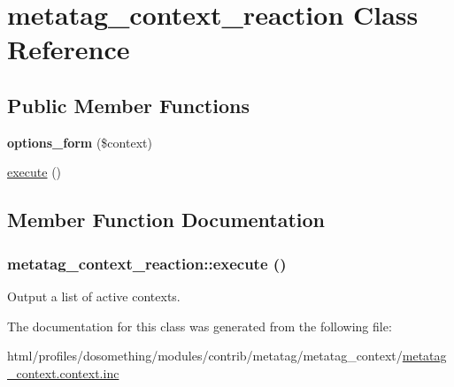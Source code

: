 \hypertarget{classmetatag__context__reaction}{
\section{metatag\_\-context\_\-reaction Class Reference}
\label{classmetatag__context__reaction}
}
\subsection*{Public Member Functions}
\begin{DoxyCompactItemize}
\item 
\hypertarget{classmetatag__context__reaction_a4fd234b5471839ebf1d9a4efc79d487c}{
{\bfseries options\_\-form} (\$context)}
\label{classmetatag__context__reaction_a4fd234b5471839ebf1d9a4efc79d487c}

\item 
\hyperlink{classmetatag__context__reaction_a67587e64b42f087a71aba0be93e65b96}{execute} ()
\end{DoxyCompactItemize}


\subsection{Member Function Documentation}
\hypertarget{classmetatag__context__reaction_a67587e64b42f087a71aba0be93e65b96}{
\subsubsection[{execute}]{\setlength{\rightskip}{0pt plus 5cm}metatag\_\-context\_\-reaction::execute ()}}
\label{classmetatag__context__reaction_a67587e64b42f087a71aba0be93e65b96}
Output a list of active contexts. 

The documentation for this class was generated from the following file:\begin{DoxyCompactItemize}
\item 
html/profiles/dosomething/modules/contrib/metatag/metatag\_\-context/\hyperlink{metatag__context_8context_8inc}{metatag\_\-context.context.inc}\end{DoxyCompactItemize}
